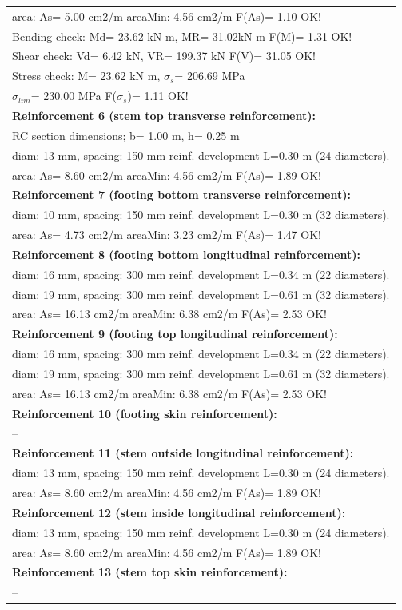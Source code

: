 \begin{center}
\begin{supertabular}[H]{|l|}
  area: As=   5.00 cm2/m areaMin:   4.56 cm2/m  F(As)= 1.10 OK!\\
  Bending check: Md=  23.62 kN m, MR=  31.02kN m  F(M)= 1.31 OK!\\
  Shear check: Vd=   6.42 kN,  VR= 199.37 kN  F(V)= 31.05 OK!\\
  Stress check: M=  23.62 kN m, $\sigma_s$= 206.69 MPa\\
    $\sigma_{lim}$= 230.00 MPa  F($\sigma_s$)= 1.11 OK!\\
\textbf{Reinforcement 6 (stem top transverse reinforcement):}\\
  RC section dimensions; b= 1.00 m, h= 0.25 m\\
  diam: 13 mm, spacing: 150 mm  reinf. development L=0.30 m (24 diameters).\\
  area: As=   8.60 cm2/m areaMin:   4.56 cm2/m  F(As)= 1.89 OK!\\
\textbf{Reinforcement 7 (footing bottom transverse reinforcement):}\\
  diam: 10 mm, spacing: 150 mm  reinf. development L=0.30 m (32 diameters).\\
  area: As=   4.73 cm2/m areaMin:   3.23 cm2/m  F(As)= 1.47 OK!\\
\textbf{Reinforcement 8 (footing bottom longitudinal reinforcement):}\\
  diam: 16 mm, spacing: 300 mm  reinf. development L=0.34 m (22 diameters).\\
  diam: 19 mm, spacing: 300 mm  reinf. development L=0.61 m (32 diameters).\\
  area: As=  16.13 cm2/m areaMin:   6.38 cm2/m  F(As)= 2.53 OK!\\
\textbf{Reinforcement 9 (footing top longitudinal reinforcement):}\\
  diam: 16 mm, spacing: 300 mm  reinf. development L=0.34 m (22 diameters).\\
  diam: 19 mm, spacing: 300 mm  reinf. development L=0.61 m (32 diameters).\\
  area: As=  16.13 cm2/m areaMin:   6.38 cm2/m  F(As)= 2.53 OK!\\
\textbf{Reinforcement 10 (footing skin reinforcement):}\\
  --\\
\textbf{Reinforcement 11 (stem outside longitudinal reinforcement):}\\
  diam: 13 mm, spacing: 150 mm  reinf. development L=0.30 m (24 diameters).\\
  area: As=   8.60 cm2/m areaMin:   4.56 cm2/m  F(As)= 1.89 OK!\\
\textbf{Reinforcement 12 (stem inside longitudinal reinforcement):}\\
  diam: 13 mm, spacing: 150 mm  reinf. development L=0.30 m (24 diameters).\\
  area: As=   8.60 cm2/m areaMin:   4.56 cm2/m  F(As)= 1.89 OK!\\
\textbf{Reinforcement 13 (stem top skin reinforcement):}\\
  --\\
\hline
\end{supertabular}
\end{center}

